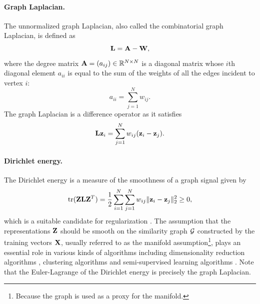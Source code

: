 \paragraph{Graph Laplacian.}
The unnormalized graph Laplacian, also called the combinatorial graph Laplacian, is defined as
\begin{equation}
	\mathbf{L} = \mathbf{A} - \mathbf{W},
\end{equation}
where the degree matrix $\mathbf{A}=(a_{ij}) \in \mathbb{R}^{N \times N}$ is a diagonal matrix whose $i$th diagonal element $a_{ii}$ is equal to the sum of the weights of all the edges incident to vertex $i$:
\begin{equation}
	a_{ii} = \sum\limits_{j=1}^{N} w_{ij}.
\end{equation}
The graph Laplacian is a difference operator as it satisfies
\begin{equation}
	\mathbf{L}\mathbf{z}_i = \sum\limits_{j=1}^{N} w_{ij} (\mathbf{z}_i - \mathbf{z}_j).
\end{equation}

\paragraph{Dirichlet energy.}
The Dirichlet energy is a measure of the smoothness of a graph signal given by
\begin{equation} \label{eqn:dirichlet_energy}
	\operatorname*{tr}(\mathbf{Z}\mathbf{L}\mathbf{Z}^T) = \frac{1}{2} \sum\limits_{i=1}^{N} \sum\limits_{j=1}^{N} w_{ij} \| \mathbf{z}_i - \mathbf{z}_j \|_2^2 \geq 0,
\end{equation}
which is a suitable candidate for regularization \cite{belkin2006manifoldRegularization}.
The assumption that the representations $\mathbf{Z}$ should be smooth on the similarity graph $\mathcal{G}$ constructed by the training vectors $\mathbf{X}$, usually referred to as the manifold assumption\footnote{Because the graph is used as a proxy for the manifold.}, plays an essential role in various kinds of algorithms including dimensionality reduction algorithms \cite{belkin2001laplacianEigenmaps}, clustering algorithms \cite{ng2002spectralClustering} and semi-supervised learning algorithms \cite{belkin2006manifoldRegularization, zhou2004manifoldRegularization}.
Note that the Euler-Lagrange of the Dirichlet energy is precisely the graph Laplacian.

